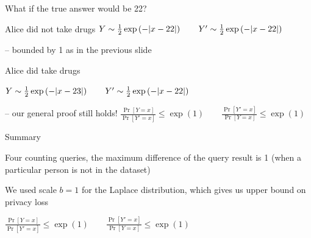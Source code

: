 \documentclass[12pt,aspectratio=169,handout]{beamer}
\begin{document}
\begin{frame}{What if the true answer would be 22?}

Alice did not take drugs
$
Y \sim  \frac{1}{2} \exp \left(- \abs{x - 22} \right) \qquad
Y' \sim \frac{1}{2} \exp \left( -\abs{x - 22} \right) 
$

-- bounded by 1 as in the previous slide 

Alice did take drugs

$Y \sim  \frac{1}{2} \exp \left(- \abs{x - 23} \right) \qquad
Y' \sim \frac{1}{2} \exp \left(- \abs{x - 22} \right)$

-- our general proof still holds!
$
\frac{\Pr[Y = x]}{\Pr[Y' = x]} \leq \exp(1) \qquad
\frac{\Pr[Y' = x]}{\Pr[Y = x]} \leq \exp(1)
$

\end{frame}


\begin{frame}{Summary}

Four counting queries, the maximum difference of the query result is 1 (when a particular person is not in the dataset)

We used scale $b = 1$ for the Laplace distribution, which gives us upper bound on privacy loss

$
\frac{\Pr[Y = x]}{\Pr[Y' = x]} \leq \exp(1) \qquad
\frac{\Pr[Y' = x]}{\Pr[Y = x]} \leq \exp(1)
$

\end{frame}
\end{document}
